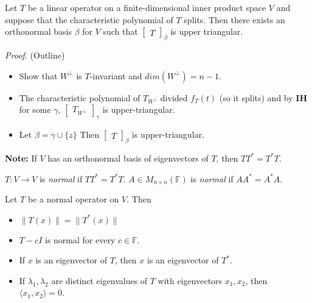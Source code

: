 \documentclass[12pt]{article}
\newenvironment{theorem}[2][Theorem]{\begin{trivlist}
\item[\hskip \labelsep {\bfseries #1}\hskip \labelsep {\bfseries #2.}]}{\end{trivlist}}
\newenvironment{definition}[2][Definition]{\begin{trivlist}
\item[\hskip \labelsep {\bfseries #1}\hskip \labelsep {\bfseries #2}]}{\end{trivlist}}
\begin{document}
\begin{theorem}{6.14 (Schur)}
Let $T$ be a linear operator on a finite-dimensional inner product space $V$ and suppose that the characteristic polynomial of $T$ splits. Then there exists an orthonormal basis $\beta$ for $V$ such that $\begin{bmatrix}
T
\end{bmatrix}_\beta$ is upper triangular.
\end{theorem}

\textit{Proof.} (Outline)

\begin{itemize}
    \item Show that $W^\perp$ is $T$-invariant and $dim(W^\perp) = n - 1$.
    
    \item The characteristic polynomial of $T_{W^\perp}$ divided $f_T(t)$ (so it splits) and by \textbf{IH} for some $\gamma$, $\begin{bmatrix}
    T_{W^\perp}
    \end{bmatrix}_\gamma$ is upper-triangular.
    
    \item Let $\beta = \gamma \cup \{z\}$ Then $\begin{bmatrix}
    T
    \end{bmatrix}_\beta$ is upper-triangular.
\end{itemize}

\noindent\textbf{Note:} If $V$ has an orthonormal basis of eigenvectors of $T$, then $TT^* = T^*T$.

\begin{definition}{7}
$T : V \to V$ is \textit{normal} if $TT^* = T^*T$. $A \in M_{n \times n}(\mathbb{F})$ is \textit{normal} if $AA^* = A^*A$.
\end{definition}

\begin{theorem}{6.15}
Let $T$ be a normal operator on $V$. Then 

\begin{itemize}
    \item[(a)] $\lVert T(x) \rVert = \lVert T^*(x) \rVert$
    
    \item[(b)] $T - cI$ is normal for every $c \in \mathbb{F}$.
    
    \item[(c)] If $x$ is an eigenvector of $T$, then $x$ is an eigenvector of $T^*$.
    
    \item[(d)] If $\lambda_1, \lambda_2$ are distinct eigenvalues of $T$ with eigenvectors $x_1, x_2$, then $\langle x_1, x_2 \rangle = 0$.
\end{itemize}
\end{theorem}
\end{document}
